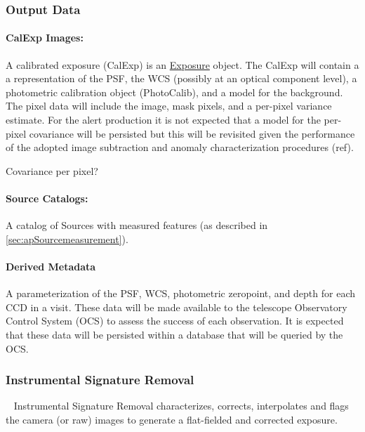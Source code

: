 \subsubsection{Output Data}

\paragraph*{CalExp Images:} A calibrated exposure (CalExp) is an \hyperref[sec:spImagesExposure]{Exposure} object. The CalExp will contain a a representation of the PSF, the WCS (possibly at an optical component level), a photometric calibration object (PhotoCalib),  and a model for the  background. The pixel data will include the image, mask pixels, and a per-pixel variance estimate. For the alert production it is not expected that a model for the per-pixel covariance will be persisted but this will be revisited given the performance of the adopted image subtraction and anomaly characterization procedures (ref).
\begin{note} Covariance per pixel? \end{note}

\paragraph*{Source Catalogs:} A catalog of Sources with measured features (as described in \ref{sec:apSourcemeasurement}). 

\paragraph*{Derived Metadata} A parameterization of the PSF, WCS, photometric zeropoint, and depth for each CCD in a visit. These data will be made available to the telescope Observatory Control System (OCS) to assess the success of each observation. It is expected that these data will be persisted within a database that will be queried by the OCS.


\subsubsection{Instrumental Signature Removal}~
\label{sec:apISR}
Instrumental Signature Removal characterizes, corrects, interpolates and flags the camera (or raw) images to generate a flat-fielded and corrected exposure.

